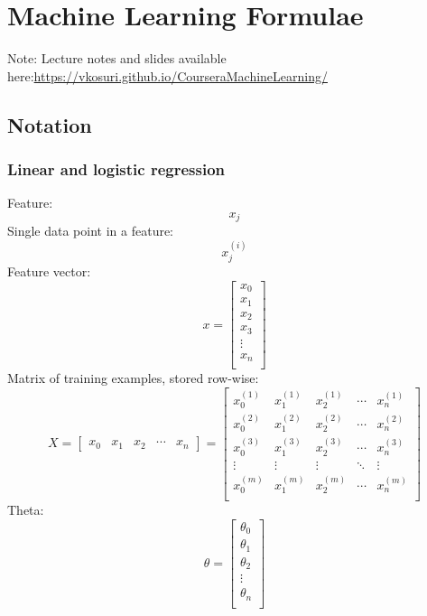 \documentclass[12pt]{article}
\begin{document}
\section{Machine Learning Formulae}
\begin{flushleft}Note: Lecture notes and slides available here:\linebreak \url{https://vkosuri.github.io/CourseraMachineLearning/}\end{flushleft} 
\subsection{Notation}
\subsubsection{Linear and logistic regression}
Feature:
\begin{equation}
x_j
\end{equation}
Single data point in a feature:
\begin{equation}
x_j^{(i)}
\end{equation}
Feature vector:
\begin{equation}
x=\begin{bmatrix}
x_0\\
x_1\\
x_2\\
x_3\\
\vdots\\
x_n\\
\end{bmatrix}
\end{equation}
Matrix of training examples, stored row-wise:
\begin{equation}
X=\begin{bmatrix}
x_0 & x_1 & x_2 & \cdots & x_n
\end{bmatrix}=\begin{bmatrix}
x_0^{(1)} & x_1^{(1)} & x_2^{(1)} & \cdots & x_n^{(1)}\\
x_0^{(2)} & x_1^{(2)} & x_2^{(2)} & \cdots & x_n^{(2)}\\
x_0^{(3)} & x_1^{(3)} & x_2^{(3)} & \cdots & x_n^{(3)}\\
\vdots & \vdots & \vdots & \ddots & \vdots\\
x_0^{(m)} & x_1^{(m)} & x_2^{(m)} & \cdots & x_n^{(m)}\\
\end{bmatrix}
\end{equation}
Theta:
\begin{equation}
\theta=\begin{bmatrix}
\theta_0\\
\theta_1\\
\theta_2\\
\vdots\\
\theta_n\\
\end{bmatrix}
\end{equation}
\end{document}
